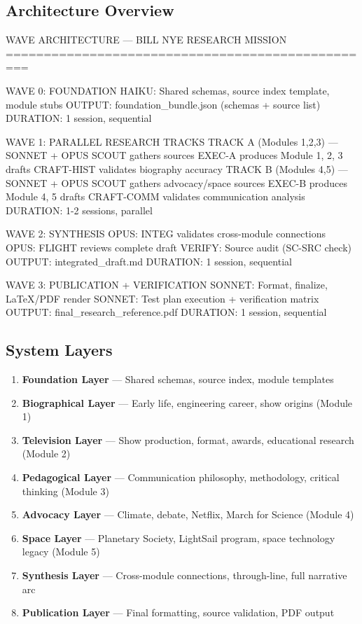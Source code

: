 \documentclass[11pt,letterpaper]{article}
\begin{document}
\subsection{Architecture Overview}

\begin{asciibox}
WAVE ARCHITECTURE --- BILL NYE RESEARCH MISSION
=================================================

WAVE 0: FOUNDATION
  HAIKU: Shared schemas, source index template, module stubs
  OUTPUT: foundation_bundle.json (schemas + source list)
  DURATION: 1 session, sequential

WAVE 1: PARALLEL RESEARCH TRACKS
  TRACK A (Modules 1,2,3) --- SONNET + OPUS
    SCOUT gathers sources
    EXEC-A produces Module 1, 2, 3 drafts
    CRAFT-HIST validates biography accuracy
  TRACK B (Modules 4,5) --- SONNET + OPUS
    SCOUT gathers advocacy/space sources
    EXEC-B produces Module 4, 5 drafts
    CRAFT-COMM validates communication analysis
  DURATION: 1-2 sessions, parallel

WAVE 2: SYNTHESIS
  OPUS: INTEG validates cross-module connections
  OPUS: FLIGHT reviews complete draft
  VERIFY: Source audit (SC-SRC check)
  OUTPUT: integrated_draft.md
  DURATION: 1 session, sequential

WAVE 3: PUBLICATION + VERIFICATION
  SONNET: Format, finalize, LaTeX/PDF render
  SONNET: Test plan execution + verification matrix
  OUTPUT: final_research_reference.pdf
  DURATION: 1 session, sequential
\end{asciibox}

\subsection{System Layers}

\begin{enumerate}[leftmargin=*]
  \item \textbf{Foundation Layer} --- Shared schemas, source index, module templates
  \item \textbf{Biographical Layer} --- Early life, engineering career, show origins (Module 1)
  \item \textbf{Television Layer} --- Show production, format, awards, educational research (Module 2)
  \item \textbf{Pedagogical Layer} --- Communication philosophy, methodology, critical thinking (Module 3)
  \item \textbf{Advocacy Layer} --- Climate, debate, Netflix, March for Science (Module 4)
  \item \textbf{Space Layer} --- Planetary Society, LightSail program, space technology legacy (Module 5)
  \item \textbf{Synthesis Layer} --- Cross-module connections, through-line, full narrative arc
  \item \textbf{Publication Layer} --- Final formatting, source validation, PDF output
\end{enumerate}
\end{document}
